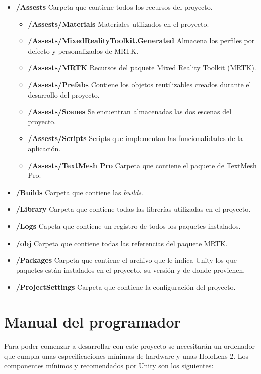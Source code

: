 \begin{itemize}
\tightlist
\item
    \textbf{/Assests} Carpeta que contiene todos los recursos del proyecto.
    \begin{itemize}
    \tightlist
    \item
        \textbf{/Assests/Materials} Materiales utilizados en el proyecto.
    \item
        \textbf{/Assests/MixedRealityToolkit.Generated} Almacena los perfiles por defecto y personalizados de MRTK.
    \item
        \textbf{/Assests/MRTK} Recursos del paquete Mixed Reality Toolkit (MRTK).
    \item
        \textbf{/Assests/Prefabs} Contiene los objetos reutilizables creados durante el desarrollo del proyecto.
    \item
        \textbf{/Assests/Scenes} Se encuentran almacenadas las dos escenas del proyecto.
    \item
        \textbf{/Assests/Scripts} Scripts que implementan las funcionalidades de la aplicación.
    \item
        \textbf{/Assests/TextMesh Pro} Carpeta que contiene el paquete de TextMesh Pro.
    \end{itemize}
\item
    \textbf{/Builds} Carpeta que contiene las \textit{builds}.
\item
    \textbf{/Library} Carpeta que contiene todas las librerías utilizadas en el proyecto.
\item
    \textbf{/Logs} Capeta que contiene un registro de todos los paquetes instalados.
\item
    \textbf{/obj} Carpeta que contiene todas las referencias del paquete MRTK.
\item
    \textbf{/Packages} Carpeta que contiene el archivo que le indica Unity los que paquetes están instalados en el proyecto, su versión y de donde provienen.
\item
    \textbf{/ProjectSettings} Carpeta que contiene la configuración del proyecto.
\end{itemize} 

\section{Manual del programador} \label{recomendados}

Para poder comenzar a desarrollar con este proyecto se necesitarán un ordenador que cumpla unas especificaciones mínimas de hardware y unas HoloLens 2. Los componentes mínimos y recomendados por Unity \cite{unity:requisitos} son los siguientes:

